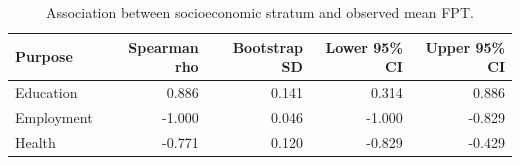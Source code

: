 \begin{table}
\caption{Association between socioeconomic stratum and observed mean FPT.}
\label{tab:s9_stratum}
\begin{tabular}{lrrrr}
\toprule
Purpose & Spearman rho & Bootstrap SD & Lower 95\% CI & Upper 95\% CI \\
\midrule
Education & 0.886 & 0.141 & 0.314 & 0.886 \\
Employment & -1.000 & 0.046 & -1.000 & -0.829 \\
Health & -0.771 & 0.120 & -0.829 & -0.429 \\
\bottomrule
\end{tabular}
\end{table}
